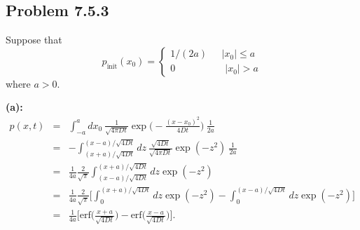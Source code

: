 \subsection{Problem 7.5.3}
Suppose that
\begin{equation*}
p_\text{init}(x_0) =  \left\{
        \begin{array}{ll}
            1/(2a) & ~~~|x_0| \leq a \\
            0 & \quad |x_0|>a
        \end{array}
    \right.
\end{equation*}
where $a>0$.

\textbf{(a):} 
\begin{eqnarray}
p(x,t) &=& \int_{-a}^{a} dx_0~\frac{1}{\sqrt{4 \pi D t} } \exp\bigg(- \frac{(x-x_0)^2}{4 D t}\bigg)~\frac{1}{2a} \nonumber \\
&=& -\int_{(x+a)/\sqrt{4Dt}}^{(x-a)/\sqrt{4Dt}} dz~\frac{\sqrt{4Dt}}{\sqrt{4 \pi D t} } \exp(- z^2)~\frac{1}{2a} \nonumber \\
&=& \frac{1}{4a} \frac{2}{\sqrt{\pi}} \int_{(x-a)/\sqrt{4Dt}}^{(x+a)/\sqrt{4Dt}} dz \exp(-z^2) \nonumber \\
&=& \frac{1}{4a} \frac{2}{\sqrt{\pi}} \bigg[ \int_{0}^{(x+a)/\sqrt{4Dt}} dz \exp(-z^2) - \int_{0}^{(x-a)/\sqrt{4Dt}} dz \exp(-z^2) \bigg] \\
&=&  \frac{1}{4a} \Bigg[ \text{erf}\bigg(\frac{x+a}{\sqrt{4 D t}}\bigg) - \text{erf}\bigg(\frac{x-a}{\sqrt{4 D t}}\bigg)\Bigg].
\end{eqnarray}


